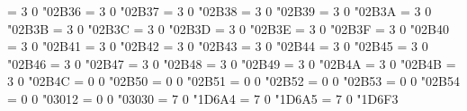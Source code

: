\Umathchardef\twoheadmapsfrom = 3 0 "02B36 %
\Umathchardef\twoheadleftdbkarrow = 3 0 "02B37 %
\Umathchardef\leftdotarrow = 3 0 "02B38 %
\Umathchardef\nvleftarrowtail = 3 0 "02B39 %
\Umathchardef\nVleftarrowtail = 3 0 "02B3A %
\Umathchardef\twoheadleftarrowtail = 3 0 "02B3B %
\Umathchardef\nvtwoheadleftarrowtail = 3 0 "02B3C %
\Umathchardef\nVtwoheadleftarrowtail = 3 0 "02B3D %
\Umathchardef\leftarrowx = 3 0 "02B3E %
\Umathchardef\leftcurvedarrow = 3 0 "02B3F %
\Umathchardef\equalleftarrow = 3 0 "02B40 %
\Umathchardef\bsimilarleftarrow = 3 0 "02B41 %
\Umathchardef\leftarrowbackapprox = 3 0 "02B42 %
\Umathchardef\rightarrowgtr = 3 0 "02B43 %
\Umathchardef\rightarrowsupset = 3 0 "02B44 %
\Umathchardef\LLeftarrow = 3 0 "02B45 %
\Umathchardef\RRightarrow = 3 0 "02B46 %
\Umathchardef\bsimilarrightarrow = 3 0 "02B47 %
\Umathchardef\rightarrowbackapprox = 3 0 "02B48 %
\Umathchardef\similarleftarrow = 3 0 "02B49 %
\Umathchardef\leftarrowapprox = 3 0 "02B4A %
\Umathchardef\leftarrowbsimilar = 3 0 "02B4B %
\Umathchardef\rightarrowbsimilar = 3 0 "02B4C %
\Umathchardef\medwhitestar = 0 0 "02B50 %
\Umathchardef\medblackstar = 0 0 "02B51 %
\Umathchardef\smwhitestar = 0 0 "02B52 %
\Umathchardef\rightpentagonblack = 0 0 "02B53 %
\Umathchardef\rightpentagon = 0 0 "02B54 %
\Umathchardef\postalmark = 0 0 "03012 %
\Umathchardef\hzigzag = 0 0 "03030 %
\Umathchardef\imath = 7 0 "1D6A4 %
\Umathchardef\jmath = 7 0 "1D6A5 %
\Umathchardef\varTheta = 7 0 "1D6F3 %
